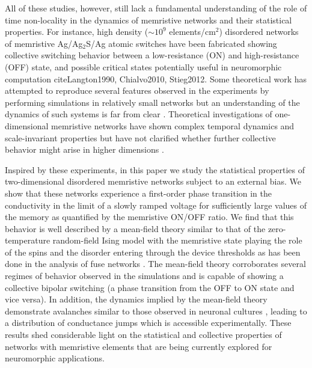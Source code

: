 \documentclass[aps,prl,reprint,groupedaddress]{revtex4-1}
\begin{document}
All of these studies, however, still lack a fundamental understanding of the role of time non-locality in the dynamics of memristive networks and their statistical properties. For instance, high density 
($\sim 10^9$ elements/cm$^2$) disordered networks of memristive Ag/Ag$_2$S/Ag atomic
 switches have been fabricated showing collective switching behavior between a low-resistance (ON) and high-resistance (OFF) state, and possible critical states potentially useful in neuromorphic computation cite{Langton1990, Chialvo2010, Stieg2012}. Some theoretical work 
 has attempted to reproduce several features observed in the experiments by performing simulations in relatively small networks but an understanding of the dynamics of such systems is far from clear \cite{NedaaeeOskoee2011, Sillin2013}. 
Theoretical investigations of one-dimensional memristive networks have shown
complex temporal dynamics and scale-invariant properties but
have not clarified whether further collective behavior might arise in
higher dimensions \cite{diVentra2013}. 

Inspired by these experiments, in this paper we study the statistical properties of two-dimensional disordered memristive networks subject to an external bias. We show that these networks experience a first-order phase transition in the conductivity in the limit of a slowly ramped voltage for
sufficiently large values of the memory as quantified by the memristive ON/OFF ratio.  We find that this behavior is well described by a mean-field theory
similar to that of the zero-temperature random-field Ising model \cite{Sethna1993} with the memristive state playing the role of the spins and the disorder entering through the device thresholds as has been done in
the analysis of fuse networks \cite{Zapperi1999}.
The mean-field theory corroborates several regimes of behavior observed in the simulations and is
capable of showing a collective bipolar switching (a phase transition from the OFF to ON state and
vice versa).  In addition, the dynamics implied by the mean-field theory demonstrate
avalanches similar to those observed in neuronal cultures \cite{Beggs2003}, leading 
to a distribution of conductance jumps which is accessible experimentally. These results shed considerable light on the statistical and collective properties of networks with memristive elements that are being currently explored for neuromorphic applications. 
\end{document}
